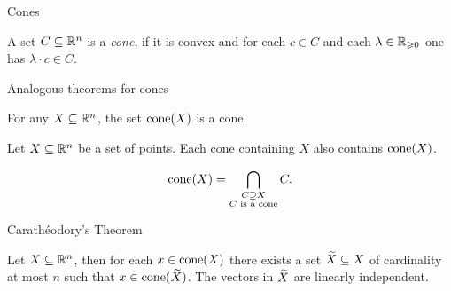\begin{frame}{Cones}
\begin{definition}
  \label{conv:def:4}
  A set $C\subseteq\mathbb{R}^n$ is a \emph{cone}, if it is convex and for each $c \in
  C$ and each $\lambda \in \mathbb{R}_{\geqslant0}$ one has  $\lambda\cdot c \in C$. 
\end{definition}
\end{frame}


\begin{frame}{Analogous theorems for cones} 
  \begin{theorem}
  \label{conv:thr:8}
  For any $X\subseteq\mathbb{R}^n$, the set $\operatorname{\mathrm{cone}}(X)$ is a cone. 
\end{theorem}

\begin{theorem}
  \label{conv:thr:9}
  Let $X\subseteq\mathbb{R}^n$ be a set of points. Each cone containing $X$ also
  contains $\operatorname{\mathrm{cone}}(X)$. 
\end{theorem}
\bigskip 
\begin{displaymath}
  \operatorname{\mathrm{cone}}(X) = \bigcap_{\substack{C \supseteq X\\ C \text{  is a cone}}} C. 
\end{displaymath}
\end{frame}


\begin{frame}{Carathéodory's Theorem}

\begin{theorem}
  Let $X\subseteq\mathbb{R}^n$, then for each $x \in \operatorname{\mathrm{cone}}(X)$ there exists a set
  $\widetilde{X}\subseteq X$ of cardinality at most $n$  such that $x \in
  \operatorname{\mathrm{cone}}(\widetilde{X})$. The vectors in $\widetilde{X}$ are linearly independent. 
\end{theorem}

\end{frame}



\begin{frame}
  
\end{frame}



\begin{frame}
  
\end{frame}

